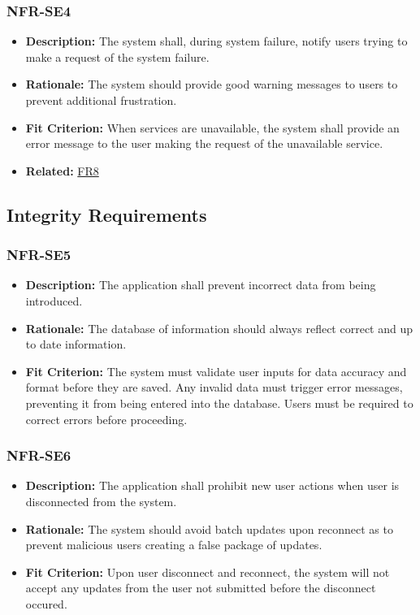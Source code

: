 \documentclass[12pt]{article}
\begin{document}
\subsubsection*{NFR-SE4}
\label{sec:SE4}
\begin{itemize}
  \item \textbf{Description:} The system shall, during system failure, notify users trying to make a request of the system failure.
  \item \textbf{Rationale:} The system should provide good warning messages to users to prevent additional frustration.
  \item \textbf{Fit Criterion:} When services are unavailable, the system shall provide an error message to the user making the request of the unavailable service.
  \item \textbf{Related:} \hyperref[sec:FR8]{FR8}
\end{itemize}
\subsection{Integrity Requirements}
\subsubsection*{NFR-SE5}
\label{sec:SE5}
\begin{itemize}
  \item \textbf{Description:} The application shall prevent incorrect data from being introduced.
  \item \textbf{Rationale:} The database of information should always reflect correct and up to date information.
  \item \textbf{Fit Criterion:} The system must validate user inputs for data accuracy and format before they are saved. Any invalid data must trigger error messages, preventing it from being entered into the database. Users must be required to correct errors before proceeding.
\end{itemize}
\subsubsection*{NFR-SE6}
\label{sec:SE6}
\begin{itemize}
  \item \textbf{Description:} The application shall prohibit new user actions when user is disconnected from the system.
  \item \textbf{Rationale:} The system should avoid batch updates upon reconnect as to prevent malicious users creating a false package of updates.
  \item \textbf{Fit Criterion:} Upon user disconnect and reconnect, the system will not accept any updates from the user not submitted before the disconnect occured.
\end{itemize}
\end{document}
